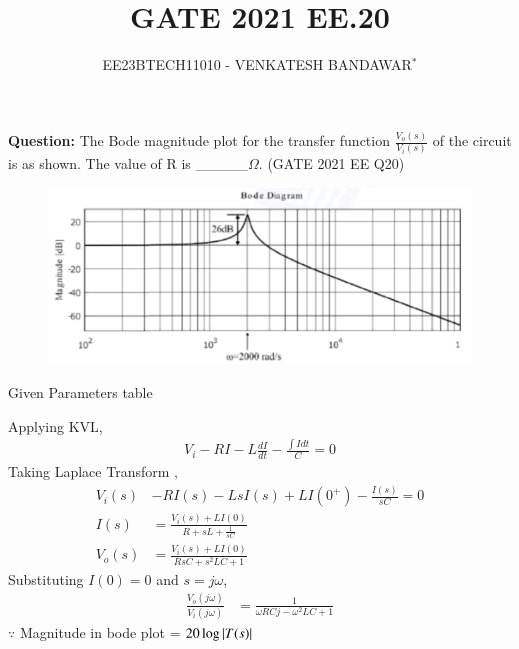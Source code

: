 \documentclass[journal,12pt,twocolumn]{IEEEtran}
\theoremstyle{remark}
\begin{document}

\vspace{3cm}

\title{GATE 2021 EE.20}
\author{EE23BTECH11010 - VENKATESH BANDAWAR$^{*}$%
}
\maketitle
\newpage
\bigskip
\textbf{Question:} The Bode magnitude plot for the transfer function $\frac{V_o(s)}{V_i(s)}$ of the circuit is as shown. The value of R is \_\_\_\_\_$\Omega$. \hfill(GATE 2021 EE Q20)
\begin{figure}[!ht]
    \centering
    
\end{figure}
\begin{figure}[!ht]
    \centering
    \includegraphics[width=\columnwidth]{2021/EE/20/figs/bode.png}
\end{figure}
\solution
\fi
\begin{table}[!ht]
    \centering
    
    \caption{Given Parameters table}
    \label{Given Parameters table_2021_EE_20}
\end{table}
Applying KVL,
\begin{align}
    V_i - R I - L\frac{dI}{dt} - \frac{\int I dt}{C} = 0
\end{align}
Taking Laplace Transform ,
\begin{align}
    V_i(s) &- RI(s) - LsI(s) + LI(0^+) - \frac{I(s)}{sC} = 0\\
    I(s) &= \frac{V_i(s) + LI(0)}{R + sL + \frac{1}{sC}}\\
    V_o(s) &= \frac{V_i(s) + LI(0)}{RsC + s^2LC + 1}
\end{align}
Substituting $I(0) = 0$ and $s = j\omega$,
\begin{align}
    \frac{V_o(j\omega)}{V_i(j\omega)} &= \frac{1}{\omega RCj -\omega^2LC + 1} 
\end{align}
$\because$ Magnitude in bode plot = $20\log \left\vert T(s)\right\vert$\\
\end{document}
